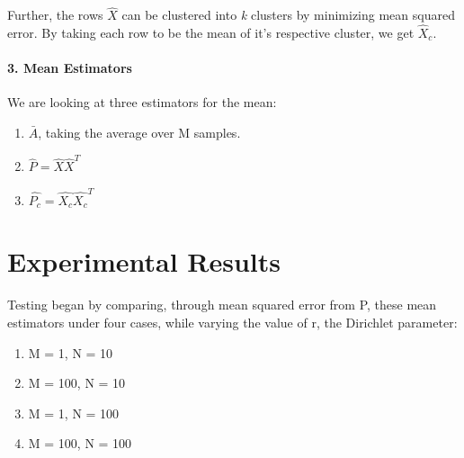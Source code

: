 \documentclass[11pt]{article}
\begin{document}
Further, the rows $\hat{X}$ can be clustered into \textit{k} clusters by minimizing mean squared error.  By taking each row to be the mean of it's respective cluster, we get $\hat{X}_c$.

\paragraph{3. Mean Estimators}  We are looking at three estimators for the mean:
\begin{enumerate}
\item $\bar{A}$, taking the average over M samples.
\item $\hat{P} = \hat{X}\hat{X}^T$
\item $\hat{P_c} = \hat{X_c}\hat{X_c}^T$
\end{enumerate}
\section{Experimental Results} Testing began by comparing, through mean squared error from P, these mean estimators under four cases, while varying the value of r, the Dirichlet parameter:
\begin{enumerate}
	\item M = 1, N = 10
	\item M = 100, N = 10
	\item M = 1, N = 100
	\item M = 100, N = 100
\end{enumerate}
\end{document}
